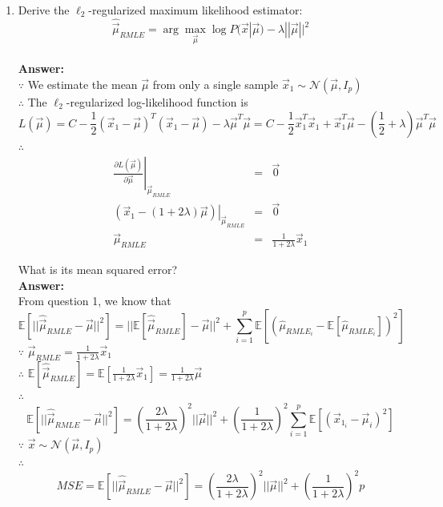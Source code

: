 \documentclass{article}
\begin{document}
\begin{enumerate}
	\item Derive the $\ell_2$-regularized maximum likelihood estimator:
	$$\hat{\vec{\mu}}_{RMLE}=\arg\max_{\vec{\mu}}\log P(\vec{x}|\vec{\mu})-\lambda ||\vec{\mu}||^2$$ 
	\\\textbf{Answer:}\\
	$\because$ We estimate the mean $\vec{\mu}$ from only a single sample $\vec{x}_1 \sim \mathcal{N}(\vec{\mu},I_p)$ \\
	$\therefore$ The $\ell_2$-regularized log-likelihood function is
	$$L(\vec{\mu}) = C - \frac{1}{2}(\vec{x}_1-\vec{\mu})^T(\vec{x}_1-\vec{\mu})-\lambda\vec{\mu}^T\vec{\mu}=C-\frac{1}{2}\vec{x}_1^T\vec{x}_1+\vec{x}_1^T\vec{\mu}-(\frac{1}{2}+\lambda)\vec{\mu}^T\vec{\mu}$$
	$\therefore$
	\begin{equation}
	\nonumber
	\begin{array}{rcl}
	\left.\frac{\partial L(\vec{\mu})}{\partial \vec{\mu}}\right|_{\vec{\mu}_{RMLE}} & = & \vec{0} \\
	\left.(\vec{x}_1-(1+2\lambda)\vec{\mu})\right|_{\vec{\mu}_{RMLE}} & = & \vec{0} \\
	\vec{\mu}_{RMLE} & = & \frac{1}{1+2\lambda}\vec{x}_1
	\end{array}
	\end{equation}
	
	What is its mean squared error?
	\\\textbf{Answer:}\\
	From question 1, we know that
	$$\mathbb{E}[||\hat{\vec{\mu}}_{RMLE}-\vec{\mu}||^2]=||\mathbb{E}[\hat{\vec{\mu}}_{RMLE}]-\vec{\mu}||^2 + \sum_{i=1}^{p}{\mathbb{E}[(\hat{\mu}_{RMLE_i}-\mathbb{E}[\hat{\mu}_{RMLE_i}])^2]}$$
	$\because$ $\vec{\mu}_{R MLE}=\frac{1}{1+2\lambda}\vec{x}_1$\\
	$\therefore$ $\mathbb{E}[\hat{\vec{\mu}}_{RMLE}]=\mathbb{E}[\frac{1}{1+2\lambda}\vec{x}_1]=\frac{1}{1+2\lambda}\vec{\mu}$\\
	$\therefore$ $$\mathbb{E}[||\hat{\vec{\mu}}_{RMLE}-\vec{\mu}||^2]=(\frac{2\lambda}{1+2\lambda})^2||\vec{\mu}||^2+(\frac{1}{1+2\lambda})^2\sum_{i=1}^{p}{\mathbb{E}[(\vec{x}_{1_i}-\vec{\mu}_i)^2]}$$
	$\because$ $\vec{x}\sim\mathcal{N}(\vec{\mu},I_p)$\\
	$\therefore$ $$MSE=\mathbb{E}[||\hat{\vec{\mu}}_{RMLE}-\vec{\mu}||^2]=(\frac{2\lambda}{1+2\lambda})^2||\vec{\mu}||^2+(\frac{1}{1+2\lambda})^2p$$
		

\end{enumerate}
\end{document}
